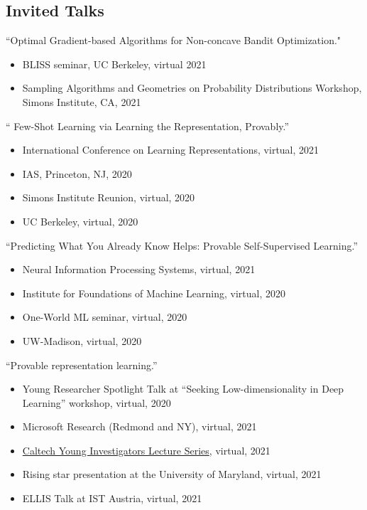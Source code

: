 \documentclass[margin, 10pt]{res} %
\begin{document}
\begin{resume}
 \section{Invited Talks}
{``Optimal Gradient-based Algorithms for Non-concave Bandit Optimization."}
 	\begin{itemize}[noitemsep,topsep=0pt,parsep=0pt,partopsep=0pt]
 		\item BLISS seminar, UC Berkeley, virtual 2021
 		\item Sampling Algorithms and Geometries on Probability Distributions Workshop, Simons Institute, CA, 2021 
 	\end{itemize}
{`` Few-Shot Learning via Learning the Representation, Provably.''
		\begin{itemize}[noitemsep,topsep=0pt,parsep=0pt,partopsep=0pt]
			\item International Conference on Learning Representations, virtual, 2021
			\item 	IAS, Princeton, NJ, 2020 
			\item  Simons Institute Reunion, virtual, 2020 
			\item UC Berkeley, virtual, 2020	
		\end{itemize}
}
{``Predicting What You Already Know Helps: Provable Self-Supervised Learning.''
	 	\begin{itemize}[noitemsep,topsep=0pt,parsep=0pt,partopsep=0pt]
	 		\item Neural Information Processing Systems, virtual, 2021
			\item Institute for Foundations of Machine Learning, virtual, 2020
			\item One-World ML seminar, virtual, 2020
	 		\item UW-Madison, virtual, 2020	 
	 	\end{itemize}
}
{``Provable representation learning.''
\begin{itemize}[noitemsep,topsep=0pt,parsep=0pt,partopsep=0pt]
	\item 		Young Researcher Spotlight Talk at ``Seeking Low-dimensionality in Deep Learning'' workshop, virtual, 2020 
	\item  Microsoft Research (Redmond and NY), virtual, 2021  
	\item \href{https://cms.caltech.edu/events/90169}{Caltech Young Investigators Lecture Series}, virtual, 2021
	\item Rising star presentation at the University of Maryland, virtual, 2021
	\item  ELLIS Talk at IST Austria, virtual, 2021

\end{itemize}}
\end{resume}
\end{document}
